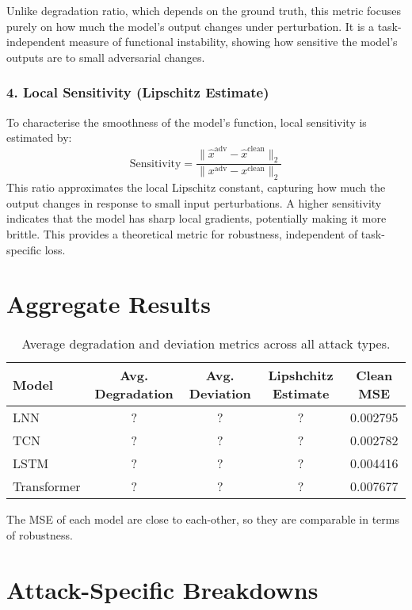 Unlike degradation ratio, which depends on the ground truth, this metric focuses purely on how much the model's output changes under perturbation. It is a task-independent measure of functional instability, showing how sensitive the model's outputs are to small adversarial changes.

\subsubsection*{4. Local Sensitivity (Lipschitz Estimate)}
To characterise the smoothness of the model's function, local sensitivity is estimated by:
\[
\text{Sensitivity} = \frac{\| \hat{x}^{\text{adv}} - \hat{x}^{\text{clean}} \|_2}{\| x^{\text{adv}} - x^{\text{clean}} \|_2}
\]
This ratio approximates the local Lipschitz constant, capturing how much the output changes in response to small input perturbations. A higher sensitivity indicates that the model has sharp local gradients, potentially making it more brittle. This provides a theoretical metric for robustness, independent of task-specific loss.

\section{Aggregate Results}

\begin{table}[H]
\centering
\begin{tabular}{|l|c|c|c|c|}
\hline
\textbf{Model} & \textbf{Avg. Degradation} & \textbf{Avg. Deviation} & \textbf{Lipshchitz Estimate} & \textbf{Clean MSE} \\
\hline
LNN         & ? & ? & ? & 0.002795 \\
TCN        & ? & ? & ? & 0.002782 \\
LSTM         & ? & ? & ? & 0.004416 \\
Transformer & ? & ? & ? & 0.007677 \\ 
\hline
\end{tabular}
\caption{Average degradation and deviation metrics across all attack types.}
\label{tab:agg_metrics}
\end{table}

The MSE of each model are close to each-other, so they are comparable in terms of robustness.

\section{Attack-Specific Breakdowns}

